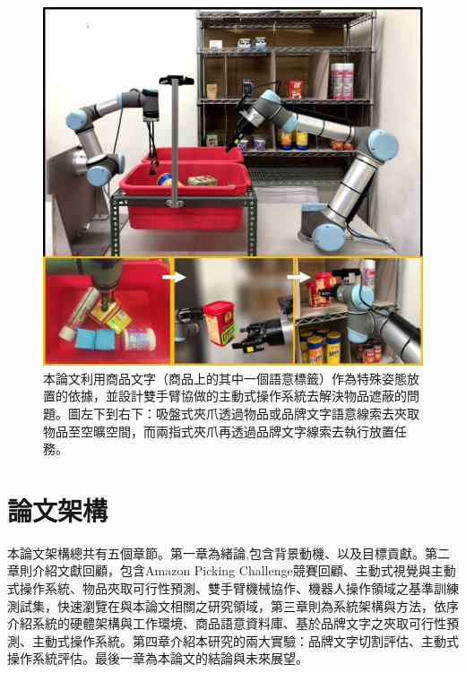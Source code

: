 \begin{figure}[ht]
	\centering
	\includegraphics[height=!, width=0.7\linewidth, keepaspectratio=true]
	{./figures/pose-aware-placing-teaser-v3.jpg}
  \caption{本論文利用商品文字（商品上的其中一個語意標籤）作為特殊姿態放置的依據，並設計雙手臂協做的主動式操作系統去解決物品遮蔽的問題。圖左下到右下：吸盤式夾爪透過物品或品牌文字語意線索去夾取物品至空曠空間，而兩指式夾爪再透過品牌文字線索去執行放置任務。}
  \label{figure:teaser}
\end{figure}

\section{論文架構}
本論文架構總共有五個章節。第一章為緒論,包含背景動機、以及目標貢獻。第二章則介紹文獻回顧，包含Amazon Picking Challenge競賽回顧、主動式視覺與主動式操作系統、物品夾取可行性預測、雙手臂機械協作、機器人操作領域之基準訓練測試集，快速瀏覽在與本論文相關之研究領域，第三章則為系統架構與方法，依序介紹系統的硬體架構與工作環境、商品語意資料庫、基於品牌文字之夾取可行性預測、主動式操作系統。第四章介紹本研究的兩大實驗：品牌文字切割評估、主動式操作系統評估。最後一章為本論文的結論與未來展望。
